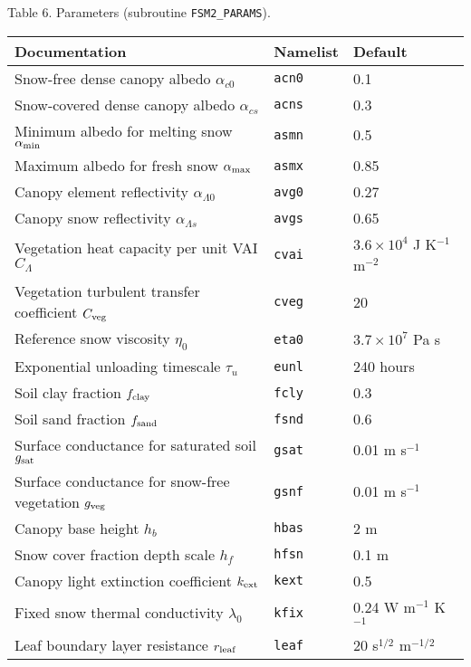 \documentclass[fleqn]{article}
\begin{document}
{Table 6. Parameters (subroutine {\tt FSM2\_PARAMS}).
\begin{longtable}{|l|l|l|}
\hline
Documentation                                      & Namelist   & Default          \\
\hline
Snow-free dense canopy albedo $\alpha_{c0}$        & {\tt acn0} & 0.1              \\
Snow-covered dense canopy albedo $\alpha_{cs}$     & {\tt acns} & 0.3              \\ 
Minimum albedo for melting snow $\alpha_{\rm min}$ & {\tt asmn} & 0.5              \\
Maximum albedo for fresh snow $\alpha_{\rm max}$   & {\tt asmx} & 0.85             \\
Canopy element reflectivity $\alpha_{\Lambda 0}$   & {\tt avg0} & 0.27             \\
Canopy snow reflectivity $\alpha_{\Lambda s}$      & {\tt avgs} & 0.65             \\ 
Vegetation heat capacity per unit VAI $C_\Lambda$  & {\tt cvai} & $3.6 \times 10^4$ J K$^{-1}$ m$^{-2}$ \\
Vegetation turbulent transfer coefficient $C_{\rm veg}$ & {\tt cveg} & 20          \\
Reference snow viscosity $\eta_0$                  & {\tt eta0} & $3.7 \times 10^7$ Pa s \\
Exponential unloading timescale $\tau_u$           & {\tt eunl} & 240 hours        \\
Soil clay fraction $f_{\rm clay}$                  & {\tt fcly} & 0.3              \\
Soil sand fraction $f_{\rm sand}$                  & {\tt fsnd} & 0.6              \\
Surface conductance for saturated soil $g_{\rm sat}$ & {\tt gsat} & 0.01 m s$^{-1}$\\
Surface conductance for snow-free vegetation $g_{\rm veg}$ & {\tt gsnf} & 0.01 m s$^{-1}$   \\
Canopy base height $h_b$                           & {\tt hbas} & 2 m              \\
Snow cover fraction depth scale $h_f$              & {\tt hfsn} & 0.1 m            \\
Canopy light extinction coefficient $k_{\rm ext}$  & {\tt kext} &  0.5             \\
Fixed snow thermal conductivity $\lambda_0$        & {\tt kfix} & 0.24 W m$^{-1}$ K$^{-1}$  \\
Leaf boundary layer resistance $r_{\rm leaf}$      & {\tt leaf} & 20 s$^{1/2}$ m$^{-1/2}$   \\ 

\end{longtable}}
\end{document}
